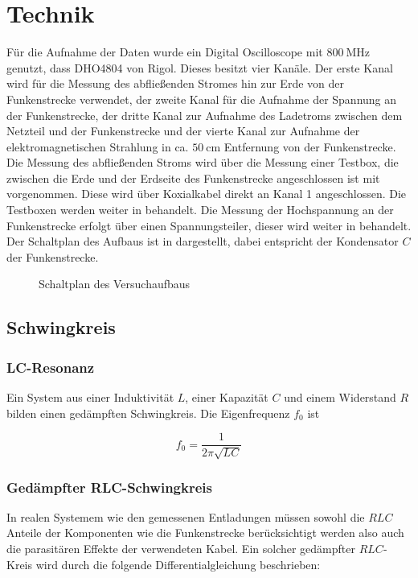 \section{Technik}
\label{sec:technic}
Für die Aufnahme der Daten wurde ein Digital Oscilloscope mit \(\SI{800}{\mega\hertz}\) genutzt, dass DHO4804 von Rigol. Dieses besitzt vier Kanäle. Der erste Kanal wird für die Messung des abfließenden Stromes hin zur Erde von der Funkenstrecke verwendet, der zweite Kanal für die Aufnahme der Spannung an der Funkenstrecke, der dritte Kanal zur Aufnahme des Ladetroms zwischen dem Netzteil und der Funkenstrecke und der vierte Kanal zur Aufnahme der elektromagnetischen Strahlung in ca. \(\SI{50}{\centi\meter}\) Entfernung von der Funkenstrecke. Die Messung des abfließenden Stroms wird über die Messung einer Testbox, die zwischen die Erde und der Erdseite des Funkenstrecke angeschlossen ist mit vorgenommen. Diese wird über Koxialkabel direkt an Kanal 1 angeschlossen. Die Testboxen werden weiter in  behandelt. Die Messung der Hochspannung an der Funkenstrecke erfolgt über einen Spannungsteiler, dieser wird weiter in  behandelt. Der Schaltplan des Aufbaus ist in  dargestellt, dabei entspricht der Kondensator \(C\) der Funkenstrecke. 

\begin{figure}[H]
    \centering
    
    \caption{Schaltplan des Versuchaufbaus}
    \label{fig:setup_circuit}
\end{figure}


\subsection{Schwingkreis}

\subsubsection{LC-Resonanz}
Ein System aus einer Induktivität \(L\), einer Kapazität \(C\) und einem Widerstand \(R\) bilden einen gedämpften Schwingkreis. Die Eigenfrequenz \(f_0\) ist

\begin{equation}
f_0 = \frac{1}{2\pi \sqrt{LC}}
\end{equation}

\subsubsection{Gedämpfter RLC-Schwingkreis}
In realen Systemem wie den gemessenen Entladungen müssen sowohl die \(RLC\) Anteile der Komponenten wie die Funkenstrecke berücksichtigt werden also auch die parasitären Effekte der verwendeten Kabel. Ein solcher gedämpfter \(RLC\)-Kreis wird durch die folgende Differentialgleichung beschrieben:

